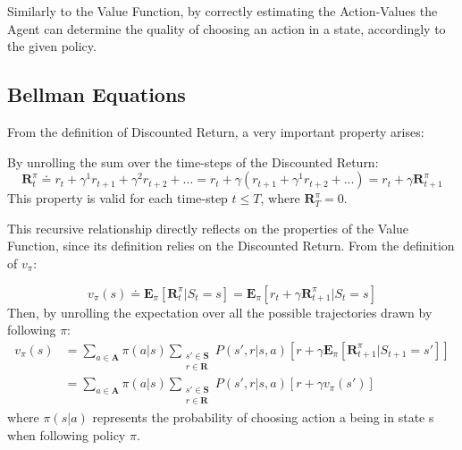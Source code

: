             Similarly to the Value Function, by correctly estimating the Action-Values the Agent can determine the quality of choosing an action in a state, accordingly to the given policy. 
            
        \subsection{Bellman Equations}
            \label{subs:bellman}
            From the definition of Discounted Return, a very important property arises:
            
            \begin{property}
                \label{prop:recreturn}
                By unrolling the sum over the time-steps of the Discounted Return:
                \[ \mathbf{R}_{t}^{\pi} \doteq r_{t} + \gamma^{1} r_{t+1} + \gamma^{2} r_{t+2} + ... = r_{t} + \gamma \left( r_{t+1} + \gamma^{1} r_{t+2} + ... \right) = r_{t} + \gamma \mathbf{R}_{t+1}^{\pi}  \]
                This property is valid for each time-step $t \leq T$, where $\mathbf{R}_{T}^{\pi} = 0$.
            \end{property}
            
            This recursive relationship directly reflects on the properties of the Value Function, since its definition relies on the Discounted Return. From the definition of $v_{\pi}$:
            
            \begin{definition}
                \label{def:bellmanvalue}
                \[ v_{\pi}(s) \doteq \mathbf{E}_{\pi} \left[ \mathbf{R}_{t}^{\pi} | S_{t} = s \right] =
                    \mathbf{E}_{\pi} \left[ r_{t} + \gamma \mathbf{R}_{t+1}^{\pi} | S_{t} = s \right] \]
                Then, by unrolling the expectation over all the possible trajectories drawn by following $\pi$:
                \begin{align*}
                    v_{\pi}(s) &= \sum_{a \in \mathbf{A}} \pi(a|s) 
                                \sum_{\substack{s' \in \mathbf{S}\\r \in \mathbf{R}}} P(s', r | s, a) 
                                \left[ r + \gamma \mathbf{E}_{\pi} \left[ \mathbf{R}_{t+1}^{\pi} | S_{t+1} = s' \right] \right] \\        
                                &= \sum_{a \in \mathbf{A}} \pi(a|s) 
                                \sum_{\substack{s' \in \mathbf{S}\\r \in \mathbf{R}}} P(s', r | s, a) 
                                \left[ r + \gamma v_{\pi}(s') \right]
                \end{align*}
                where $\pi(s|a)$ represents the probability of choosing action a being in state s when following policy $\pi$.
            \end{definition}
            
